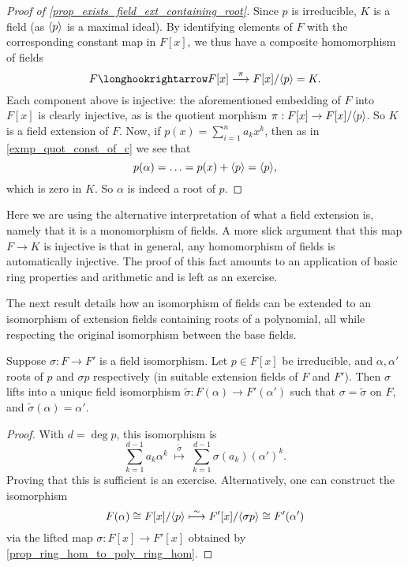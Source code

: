 \begin{proof}[Proof of \cref{prop_exists_field_ext_containing_root}]
    Since $p$ is irreducible, $K$ is a field (as $\langle {p} \rangle$ is a maximal ideal). By identifying elements of $F$ with the corresponding constant map in $F[x]$, we thus have a composite homomorphism of fields
    \[
        F \inclusion F[x] \stackrel{\pi}{\longrightarrow} F[x]/\gen{p} = K.
    \]
    Each component above is injective: the aforementioned embedding of $F$ into $F[x]$ is clearly injective, as is the quotient morphism $\pi: F[x] \to F[x]/\langle {p} \rangle$. So $K$ is a field extension of $F$. Now, if $p(x) = \sum_{i = 1}^{n} a_k x^k$, then as in \cref{exmp_quot_const_of_c} we see that
    \[
        p(\alpha) = \ldots = p(x) + \langle {p} \rangle = \langle {p} \rangle,
    \]
    which is zero in $K$. So $\alpha$ is indeed a root of $p$.
\end{proof}

\begin{remark}
    Here we are using the alternative interpretation of what a field extension is, namely that it is a monomorphism of fields. A more slick argument that this map $F \to K$ is injective is that in general, any homomorphism of fields is automatically injective. The proof of this fact amounts to an application of basic ring properties and arithmetic and is left as an exercise.
\end{remark}

The next result details how an isomorphism of fields can be extended to an isomorphism of extension fields containing roots of a polynomial, all while respecting the original isomorphism between the base fields.

\begin{proposition}
\label{prop_field_isom_lifts_to_root_isom}
    Suppose $\sigma: F \to F'$ is a field isomorphism. Let $p \in F[x]$ be irreducible, and $\alpha, \alpha'$ roots of $p$ and $\sigma p$ respectively (in suitable extension fields of $F$ and $F'$). Then $\sigma$ lifts into a unique field isomorphism $\widetilde{\sigma}: F(\alpha) \to F'(\alpha')$ such that $\sigma = \widetilde{\sigma}$ on $F$, and $\widetilde{\sigma}(\alpha) = \alpha'$.
\end{proposition}

\begin{proof}
    With $d = \deg{p}$, this isomorphism is
    \[
        \sum_{k = 1}^{d - 1} a_k \alpha^k \; \stackrel{\widetilde{\sigma}}{\longmapsto} \; \sum_{k = 1}^{d - 1} \sigma(a_k) (\alpha')^k.
    \]
    Proving that this is sufficient is an exercise. Alternatively, one can construct the isomorphism
    \[
        F(\alpha) \cong F[x]/\langle {p} \rangle \stackrel{\sim}{\longmapsto} F'[x]/\langle {\sigma p} \rangle \cong F'(\alpha')
    \]
    via the lifted map $\sigma: F[x] \to F'[x]$ obtained by \cref{prop_ring_hom_to_poly_ring_hom}.
\end{proof}

